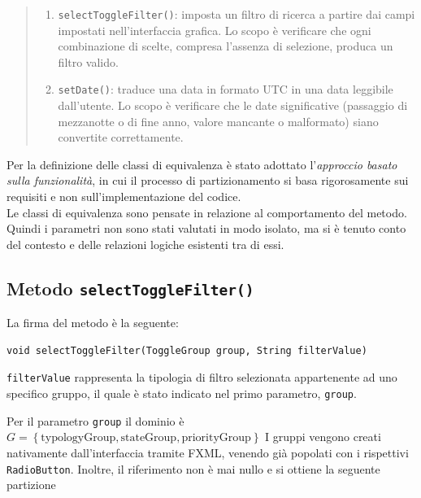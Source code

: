 \begin{quote}
\begin{enumerate}[label=\textit{\arabic*}]
   \item \texttt{selectToggleFilter()}: imposta un filtro di ricerca a partire 
   dai campi impostati nell’interfaccia grafica. Lo scopo è verificare che ogni combinazione di scelte, compresa l’assenza di selezione, produca un filtro valido.
  
  \item \texttt{setDate()}: traduce una data in formato UTC in una data leggibile dall'utente. 
  Lo scopo è verificare che le date significative (passaggio di mezzanotte o di fine anno, valore mancante o malformato) 
  siano convertite correttamente.
\end{enumerate} 
\end{quote}

\noindent Per la definizione delle classi di equivalenza è stato adottato l'\textit{approccio basato sulla funzionalità}, 
in cui il processo di partizionamento si basa rigorosamente sui requisiti
e non sull'implementazione del codice. \\
\indent Le classi di equivalenza sono pensate in relazione al
comportamento del metodo. Quindi i parametri non sono stati valutati in modo isolato, ma si
è tenuto conto del contesto e delle relazioni logiche esistenti tra di essi.

\subsection{Metodo \texttt{selectToggleFilter()}}

\noindent La firma del metodo è la seguente:

\begin{minipage}{\linewidth}
\centering\begin{verbatim}
void selectToggleFilter(ToggleGroup group, String filterValue)
\end{verbatim}
\end{minipage}

\noindent\texttt{filterValue} rappresenta la tipologia di filtro selezionata appartenente ad uno specifico
gruppo, il quale è stato indicato nel primo parametro, \texttt{group}.

Per il parametro \texttt{group} il dominio è 
$G = \left\{ \text{typologyGroup}, \text{stateGroup},\text{priorityGroup}\right\}$ 
I gruppi vengono creati nativamente dall'interfaccia tramite FXML, venendo 
già popolati con i rispettivi \texttt{RadioButton}. Inoltre, il riferimento
non è mai nullo e si ottiene la seguente partizione


